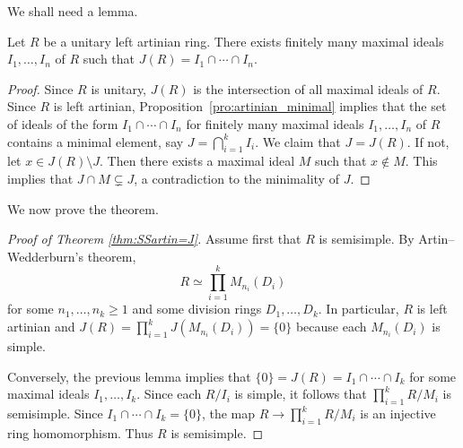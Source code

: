 We shall need a lemma.

\begin{lemma}
	\label{lem:Jartiniano}
	Let $R$ be a unitary left artinian ring. There exists finitely many maximal ideals 
	$I_1,\dots,I_n$ of $R$ such that 
	$J(R)=I_1\cap\cdots\cap I_n$.
\end{lemma}

\begin{proof}
	Since $R$ is
	unitary, $J(R)$ is the intersection of all maximal ideals of $R$. Since $R$ is left artinian,
	Proposition~\ref{pro:artinian_minimal} implies that 
	the set of ideals of the form
	$I_1\cap\cdots\cap I_n$ for finitely many maximal ideals $I_1,\dots,I_n$ of $R$ 
	contains a minimal element, say 
	$J=\bigcap_{i=1}^k I_i$. We claim that $J=J(R)$. If not, let $x\in
	J(R)\setminus J$. Then there exists a maximal ideal $M$ such that $x\not\in
	M$. This implies that $J\cap M\subsetneq J$, a contradiction to the minimality of 
    $J$. 
\end{proof}

We now prove the theorem. 

\begin{proof}[Proof of Theorem \ref{thm:SSartin=J}]
	Assume first that $R$ is semisimple. By Artin--Wedderburn's theorem, 
	\[
		R\simeq\prod_{i=1}^kM_{n_i}(D_i)
	\]
	for some $n_1,\dots,n_k\geq1$ and some division rings $D_1,\dots,D_k$. 
	In particular, $R$ is left artinian and $J(R)=\prod_{i=1}^kJ(M_{n_i}(D_i))=\{0\}$
	because each $M_{n_i}(D_i)$ is simple. 

    Conversely, the previous lemma implies that $\{0\}=J(R)=I_1\cap\cdots\cap I_k$ for some
    maximal ideals $I_1,\dots,I_k$. Since each $R/I_i$ is simple, it follows that 
    $\prod_{i=1}^k R/M_i$ is semisimple. Since $I_1\cap\cdots\cap I_k=\{0\}$, the map 
	$R\to \prod_{i=1}^k R/M_i$ is an injective ring homomorphism. Thus $R$ 
	is semisimple. 
\end{proof}




